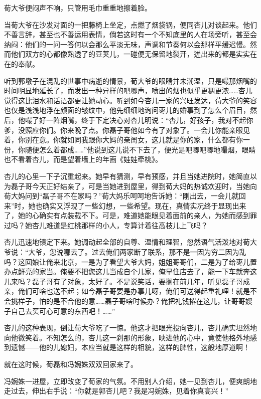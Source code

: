 \par 荀大爷便闷声不响，只管用毛巾重重地擦着脸。
\par 当荀大爷在沙发对面的一把藤椅上坐定，点燃了烟袋锅，便同杏儿对谈起来。他们不善言辞，甚至也不善运用表情，倘若这时有一个不知底里的人在场旁听，甚至会纳闷：他们的一问一答何以会那么平淡无味，声调和节奏何以会那样平缓迟慢。然而他们双方的心都像熟透了的豆荚儿，一碰便无保留地裂开，迸出来的都是实实在在的奉献。
\par 听到郭墩子在混乱的世事中病逝的情景，荀大爷的眼睛并未潮湿，只是嘬那烟嘴的时间明显地延长了，而发出一种异样的吧唧声，喷出的烟也似乎更稠更浓……杏儿觉得这比泪水和话语都更让她动心。听到如今杏儿一家的兴旺发达，荀大爷的笑容也仅是浅浅地浮在颜面的皱纹中，他先细细地询问枣儿的婚事到了怎么个眉目，然后，他嘬了好一阵烟嘴，终于下定决心对杏儿明说：“杏儿，好孩子，我对不起你爹，没照应你们。你来晚了点。你磊子哥他如今有了对象了。一会儿你能亲眼见着，你别在意。你就如同我跟你大妈的亲闺女，这儿就是你的家，什么都有你一份，你随便怎么着都成……”他说到这儿说不下去了，便光是吧唧吧唧地嘬烟，眼睛也不看着杏儿，而是望着墙上的年画《娃娃牵桃》。
\par 杏儿的心里一下子沉重起来。她早有猜测，早有预感，并且当她进院时，她简直以为磊子哥今天正好结亲了，可是当她进到屋里，得到荀大妈的热诚欢迎时，当她向荀大妈问到“磊子哥不在家吗？”荀大妈乐呵呵地告诉她：“刚出去，一会儿就回来”时，她也确实又浮现了一些幻想，一些希望。现在，真情实况终于显现出来了，她的心确实有点装载不下。可是，难道她能眼见着面前的亲人，为她而感到罪过吗？她杏儿难道是红桃那样的小人，专算计着往高枝儿上飞吗？
\par 杏儿迅速地镇定下来。她调动起全部的自尊、温情和理智，忽然语气活泼地对荀大爷说：“大爷，您说哪去了。过去俺们两家断了联系，那不是一因为穷二因为乱吗？这回娘让俺来北京，一是为了看望大爷大妈，姐姐哥哥们，二是为了给枣儿置办点鲜亮的家当。俺要不把您这儿当成自个儿家，俺早住店去了，能一下车就奔这儿来吗？磊子哥有了对象，太好了。不是说笑话，要搁在前几年，听见磊子哥成亲，俺们可啥也送不起；如今磊子哥要是办事儿呀，俺们可送得起重礼哩！就是不会挑样子，怕的是不合他的意……磊子哥啥时候办？俺把礼钱撂在这儿，让哥哥嫂子自己去买可心可意的东西吧！……”
\par 杏儿的这种表现，倒让荀大爷吃了一惊。他这才把眼光投向杏儿，杏儿确实坦然地向他微笑着。不知怎么的，杏儿这一刹那的形象，映进他的心中，竟使他格外地感到遗憾——他的儿媳妇，本应当就是这样的相貌，这样的脾性，这般地厚道啊！
\par 就在这时候，荀磊和冯婉姝双双回家来了。
\par 冯婉姝一进屋，立即改变了荀家的气氛。不用别人介绍，她一见到杏儿，便爽朗地走过去，伸出右手说：“你就是郭杏儿吧？我是冯婉姝，见着你真高兴！”
